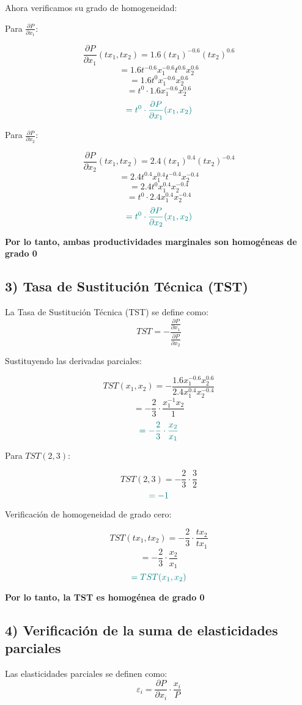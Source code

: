 \documentclass{article}
\begin{document}
Ahora verificamos su grado de homogeneidad:

Para \(\frac{\partial P}{\partial x_1}\):

\[
\frac{\partial P}{\partial x_1}(tx_1,tx_2) = 1.6(tx_1)^{-0.6}(tx_2)^{0.6}
\]
\[
= 1.6t^{-0.6}x_1^{-0.6}t^{0.6}x_2^{0.6}
\]
\[
= 1.6t^{0}x_1^{-0.6}x_2^{0.6}
\]
\[
= t^0 \cdot 1.6x_1^{-0.6}x_2^{0.6}
\]
\[
\color{teal}
= t^0 \cdot \frac{\partial P}{\partial x_1}(x_1,x_2)
\]

Para \(\frac{\partial P}{\partial x_2}\):

\[
\frac{\partial P}{\partial x_2}(tx_1,tx_2) = 2.4(tx_1)^{0.4}(tx_2)^{-0.4}
\]
\[
= 2.4t^{0.4}x_1^{0.4}t^{-0.4}x_2^{-0.4}
\]
\[
= 2.4t^{0}x_1^{0.4}x_2^{-0.4}
\]
\[
= t^0 \cdot 2.4x_1^{0.4}x_2^{-0.4}
\]
\[
\color{teal}
= t^0 \cdot \frac{\partial P}{\partial x_2}(x_1,x_2)
\]

\textbf{\color{teal}Por lo tanto, ambas productividades marginales son homogéneas de grado 0}


\subsection*{3) Tasa de Sustitución Técnica (TST)}

La Tasa de Sustitución Técnica (TST) se define como:
\[
TST = -\frac{\frac{\partial P}{\partial x_1}}{\frac{\partial P}{\partial x_2}}
\]

Sustituyendo las derivadas parciales:

\[
TST(x_1, x_2) = -\frac{1.6x_1^{-0.6}x_2^{0.6}}{2.4x_1^{0.4}x_2^{-0.4}}
\]
\[
= -\frac{2}{3} \cdot \frac{x_1^{-1}x_2}{1}
\]
\[
\color{teal}
= -\frac{2}{3} \cdot \frac{x_2}{x_1}
\]

Para \(TST(2,3)\):

\[
TST(2,3) = -\frac{2}{3} \cdot \frac{3}{2}
\]
\[
\color{teal}
= -1
\]

Verificación de homogeneidad de grado cero:

\[
TST(tx_1, tx_2) = -\frac{2}{3} \cdot \frac{tx_2}{tx_1}
\]
\[
= -\frac{2}{3} \cdot \frac{x_2}{x_1}
\]
\[
\color{teal}
= TST(x_1, x_2)
\]

\textbf{\color{teal}Por lo tanto, la TST es homogénea de grado 0}

\subsection*{4) Verificación de la suma de elasticidades parciales}

Las elasticidades parciales se definen como:
\[
\varepsilon_i = \frac{\partial P}{\partial x_i} \cdot \frac{x_i}{P}
\]
\end{document}
